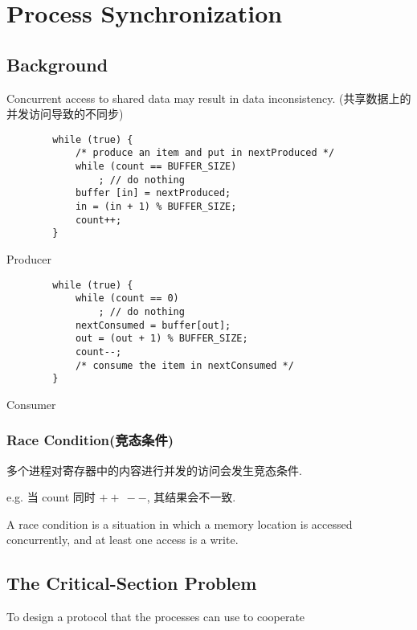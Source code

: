 \newpage
\section{Process Synchronization}
\subsection{Background}
Concurrent access to shared data may result in data
inconsistency. (共享数据上的并发访问导致的不同步)

\begin{code}
    \begin{verbatim}
        while (true) {
            /* produce an item and put in nextProduced */
            while (count == BUFFER_SIZE)
                ; // do nothing
            buffer [in] = nextProduced;
            in = (in + 1) % BUFFER_SIZE;
            count++;
        }
    \end{verbatim}
    \caption{Producer}
\end{code}

\begin{code}
    \begin{verbatim}
        while (true) {
            while (count == 0)
                ; // do nothing
            nextConsumed = buffer[out];
            out = (out + 1) % BUFFER_SIZE;
            count--;
            /* consume the item in nextConsumed */
        }
    \end{verbatim}
    \caption{Consumer}
\end{code}

\subsubsection{Race Condition(竞态条件)}
多个进程对寄存器中的内容进行并发的访问会发生竞态条件. 

e.g. 当 count 同时 $++\ --$, 其结果会不一致. 

\begin{definition}
    A race condition is a situation in which a memory location is accessed concurrently, and at least one access is a write.
\end{definition}%

\subsection{The Critical-Section Problem}
To design a protocol that the processes can use to cooperate

